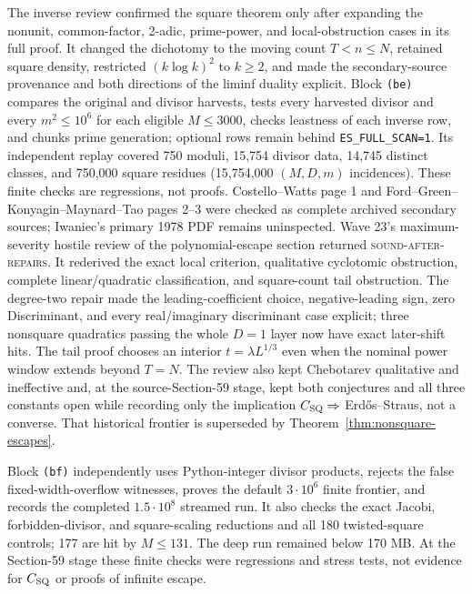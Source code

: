 \documentclass[10pt,reqno]{amsart}
\theoremstyle{definition}
\newcommand{\1}{\mathbf 1}
\begin{document}
The inverse review confirmed the square theorem only after expanding the
nonunit, common-factor, 2-adic, prime-power, and local-obstruction cases in
its full proof.  It changed the dichotomy to the moving count
$T<n\leq N$, retained square density, restricted $(k\log k)^2$ to $k\geq2$,
and made the secondary-source provenance and both directions of the liminf
duality explicit.  Block \texttt{(be)} compares the original and divisor
harvests, tests every harvested divisor and every $m^2\leq10^6$ for each
eligible $M\leq3000$, checks leastness of each inverse row, and chunks prime
generation; optional rows remain behind \texttt{ES\_FULL\_SCAN=1}.  Its
independent replay covered 750 moduli, 15,754 divisor data, 14,745 distinct
classes, and 750,000 square residues (15,754,000 $(M,D,m)$ incidences).
These finite checks are regressions, not proofs.  Costello--Watts page 1 and
Ford--Green--Konyagin--Maynard--Tao pages 2--3 were checked as complete
archived secondary sources; Iwaniec's primary 1978 PDF remains uninspected.
Wave 23's maximum-severity hostile review of the polynomial-escape section
returned \textsc{sound-after-repairs}.  It rederived the exact local
criterion, qualitative cyclotomic obstruction, complete linear/quadratic
classification, and square-count tail obstruction.  The degree-two repair
made the leading-coefficient choice, negative-leading sign, zero
Discriminant, and every real/imaginary discriminant case explicit; three
nonsquare quadratics passing the whole $D=1$ layer now have exact later-shift
hits.  The tail proof chooses an interior $t=\lambda L^{1/3}$ even when the
nominal power window extends beyond $T=N$.  The review also kept Chebotarev
qualitative and ineffective and, at the source-Section-59 stage, kept both
conjectures and all three constants open while recording only the implication
$C_{\rm SQ}\Rightarrow$ Erd\H{o}s--Straus, not a converse.  That historical
frontier is superseded by Theorem~\ref{thm:nonsquare-escapes}.

Block \texttt{(bf)} independently uses Python-integer divisor products,
rejects the false fixed-width-overflow witnesses, proves the default
$3\cdot10^6$ finite frontier, and records the completed
$1.5\cdot10^8$ streamed run.  It also checks the exact Jacobi,
forbidden-divisor, and square-scaling reductions and all 180 twisted-square
controls; 177 are hit by $M\leq131$.  The deep run remained below 170 MB.
At the Section-59 stage these finite checks were regressions and stress
tests, not evidence for $C_{\rm SQ}$ or proofs of infinite escape.
\end{document}
